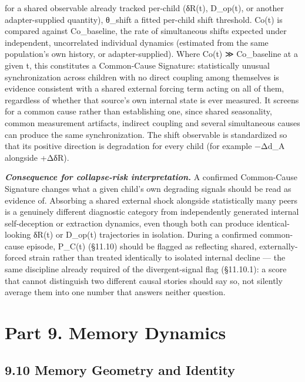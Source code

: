 \documentclass[
]{article}
\begin{document}
for a shared observable already tracked per-child (δR(t), D\_op(t), or
another adapter-supplied quantity), θ\_shift a fitted per-child shift
threshold. Co(t) is compared against Co\_baseline, the rate of
simultaneous shifts expected under independent, uncorrelated individual
dynamics (estimated from the same population's own history, or
adapter-supplied). Where Co(t) ≫ Co\_baseline at a given t, this
constitutes a Common-Cause Signature: statistically unusual
synchronization across children with no direct coupling among themselves
is evidence consistent with a shared external forcing term acting on all
of them, regardless of whether that source's own internal state is ever
measured. It screens for a common cause rather than establishing one,
since shared seasonality, common measurement artifacts, indirect
coupling and several simultaneous causes can produce the same
synchronization. The shift observable is standardized so that its
positive direction is degradation for every child (for example −Δd\_A
alongside +ΔδR).

\emph{\textbf{Consequence for collapse-risk interpretation.}} A
confirmed Common-Cause Signature changes what a given child's own
degrading signals should be read as evidence of. Absorbing a shared
external shock alongside statistically many peers is a genuinely
different diagnostic category from independently generated internal
self-deception or extraction dynamics, even though both can produce
identical-looking δR(t) or D\_op(t) trajectories in isolation. During a
confirmed common-cause episode, P\_C(t) (§11.10) should be flagged as
reflecting shared, externally-forced strain rather than treated
identically to isolated internal decline --- the same discipline already
required of the divergent-signal flag (§11.10.1): a score that cannot
distinguish two different causal stories should say so, not silently
average them into one number that answers neither question.

\hypertarget{part-9.-memory-dynamics}{%
\section{Part 9. Memory Dynamics}\label{part-9.-memory-dynamics}}

\hypertarget{memory-geometry-and-identity}{%
\subsection{9.10 Memory Geometry and
Identity}\label{memory-geometry-and-identity}}
\end{document}
